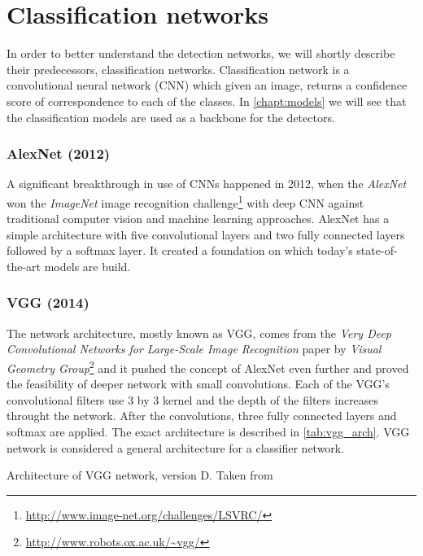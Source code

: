 \chapter{Classification networks}
\label{chapt:cnets}
In order to better understand the detection networks, we will shortly describe their predecessors, classification networks. Classification network is a convolutional neural network (CNN) \cite[ch.~9]{bib:dlbook} which given an image, returns a confidence score of correspondence to each of the classes. 
In \cref{chapt:models} we will see that the classification models are used as a backbone for the detectors.

\subsection*{AlexNet (2012)}
A significant breakthrough in use of CNNs happened in 2012, when the \textit{AlexNet} \cite{bib:alexnet} won the \textit{ImageNet} image recognition challenge\footnote{\url{http://www.image-net.org/challenges/LSVRC/}} with deep CNN against traditional computer vision and machine learning approaches. AlexNet has a simple architecture with five convolutional layers and two fully connected layers followed by a softmax layer. It created a foundation on which today's state-of-the-art models are build.

\subsection*{VGG (2014)}
\label{sec:VGG}
The network architecture, mostly known as VGG, comes from the \textit{Very Deep Convolutional Networks for Large-Scale Image Recognition} paper \cite{bib:vgg} by \textit{Visual Geometry Group}\footnote{\url{http://www.robots.ox.ac.uk/~vgg/}} and it pushed the concept of AlexNet even further and proved the feasibility of deeper network with small convolutions. Each of the VGG's convolutional filters use 3 by 3 kernel and the depth of the filters increases throught the network. After the convolutions, three fully connected layers and softmax are applied. The exact architecture is described in \cref{tab:vgg_arch}. VGG network is considered a general architecture for a classifier network. 

\begin{table}[]
    \label{tab:vgg_arch}
    \centering
    \caption{Architecture of VGG network, version D. Taken from \cite[table 1]{bib:vgg}}
\end{table}
    

